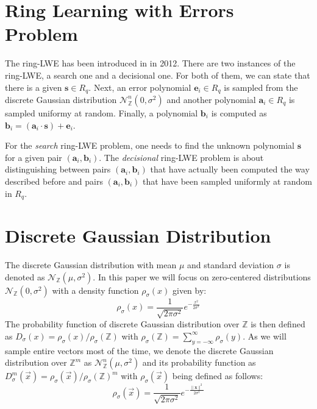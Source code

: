 \section{Ring Learning with Errors Problem}
The \acf{ring-LWE} has been introduced in \cite{cryptoeprint:2012:230} in 2012. There are two instances of the \ac{ring-LWE}, a search one and a decisional one. For both of them, we can state that there is a given \(\textbf{s} \in R_q\). Next, an error polynomial \(\textbf{e}_i \in R_q\) is sampled from the discrete Gaussian distribution \(\mathcal{N}_\mathbb{Z}^{n} (0, \sigma^2)\) and another polynomial \(\textbf{a}_i \in R_q\) is sampled uniformy at random. Finally, a polynomial \(\textbf{b}_i\) is computed as \(\textbf{b}_i = (\textbf{a}_i \cdot \textbf{s}) + \textbf{e}_i\).

For the \textit{search} \ac{ring-LWE} problem, one needs to find the unknown polynomial \(\textbf{s}\) for a given pair \((\textbf{a}_i, \textbf{b}_i)\). The \textit{decisional} \ac{ring-LWE} problem is about distinguishing between pairs \((\textbf{a}_i, \textbf{b}_i)\) that have actually been computed the way described before and pairs \((\textbf{a}_i, \textbf{b}_i)\) that have been sampled uniformly at random in \(R_q\).

\section{Discrete Gaussian Distribution}
The discrete Gaussian distribution with mean \(\mu\) and standard deviation \(\sigma\) is denoted as \(\mathcal{N}_\mathbb{Z} (\mu, \sigma^2)\). In this paper we will focus on zero-centered distributions \(\mathcal{N}_\mathbb{Z} (0, \sigma^2)\) with a density function \(\rho_\sigma(x)\) given by:
\begin{equation}
	\rho_\sigma(x)=\frac{1}{\sqrt{2\pi \sigma^2}}e^{-\frac{x^2}{2\sigma^2}}
\end{equation}
The probability function of discrete Gaussian distribution over \(\mathbb{Z}\) is then defined as \(D_\sigma(x)=\rho_\sigma(x)/\rho_\sigma(\mathbb{Z})\) with \(\rho_\sigma(\mathbb{Z})=\sum_{y=-\infty}^{\infty} \rho_\sigma(y)\). As we will sample entire vectors most of the time, we denote the discrete Gaussian distribution over \(\mathbb{Z}^m\) as \(\mathcal{N}_\mathbb{Z}^{n} (\mu, \sigma^2)\) and its probability function as \(D_\sigma^m(\vec{x})=\rho_\sigma(\vec{x})/\rho_\sigma(\mathbb{Z})^m\) with \(\rho_\sigma(\vec{x})\) being defined as follows:
\begin{equation}
	\rho_\sigma(\vec{x})=\frac{1}{\sqrt{2\pi \sigma^2}}e^{-\frac{\|\textbf{x}\|^2}{2\sigma^2}}
\end{equation}

